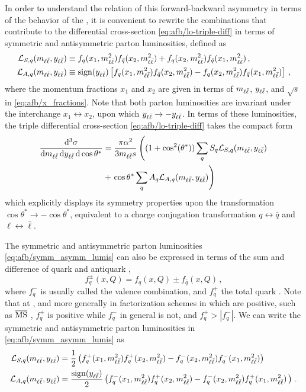 In order to understand the relation of this forward-backward
asymmetry in terms of the
behavior of the \pdfs, it is convenient
to rewrite the \pdf combinations that contribute to the differential
cross-section \cref{eq:afb/lo-triple-diff} in terms of symmetric and
antisymmetric parton luminosities, defined as
\begin{align}
  \mathcal{L}_{S,q}(m_{\ell\bar{\ell}}, y_{\ell\bar{\ell}}) &\equiv f_q(x_1,m_{\ell\bar{\ell}}^2) f_{\bar{q}}(x_2,m_{\ell\bar{\ell}}^2) + f_q(x_2,m_{\ell\bar{\ell}}^2) f_{\bar{q}}(x_1,m_{\ell\bar{\ell}}^2) \, ,
  \nonumber\\
  \mathcal{L}_{A,q}(m_{\ell\bar{\ell}}, y_{\ell\bar{\ell}}) &\equiv \operatorname{sign} (y_{\ell\bar{\ell}}) \left[ f_q(x_1,m_{\ell\bar{\ell}}^2) f_{\bar{q}}(x_2,m_{\ell\bar{\ell}}^2) - f_q(x_2,m_{\ell\bar{\ell}}^2) f_{\bar{q}}(x_1,m_{\ell\bar{\ell}}^2)\right] \, , \label{eq:afb/symm_asymm_lumis}
\end{align}
where the momentum fractions $x_1$ and $x_2$ are given in terms of $m_{\ell\bar{\ell}}$, $y_{\ell\bar{\ell}}$,
and $\sqrt{s}$ in \cref{eq:afb/x_fractions}.
Note that both parton luminosities are invariant under
the interchange $x_1\leftrightarrow x_2$, upon which $y_{\ell\bar{\ell}} \to -y_{\ell\bar{\ell}}$.
%
In terms of these luminosities, the triple differential cross-section
\cref{eq:afb/lo-triple-diff} takes the compact form
\begin{align}
  \frac{\dd^3 \sigma}{\dd m_{\ell\bar{\ell}} \, \dd y_{\ell\bar{\ell}} \, \dd\cos\theta^*} &=
  \frac{\pi \alpha^2}{3 m_{\ell\bar{\ell}} s} \left(
  (1+\cos^2({\theta^*})) \sum_q S_q \mathcal{L}_{S,q}(m_{\ell\bar{\ell}}, y_{\ell\bar{\ell}}) \right. \nonumber\\
  &+ \left. \cos\theta^* \sum_q A_q \mathcal{L}_{A,q}(m_{\ell\bar{\ell}}, y_{\ell\bar{\ell}})  \right)
  \label{eq:afb/lo-triple-diff-lumis}
\end{align}
which explicitly displays
its symmetry properties upon the transformation $\cos\theta^* \to -\cos\theta^*$,
equivalent to a charge conjugation transformation 
$q\leftrightarrow \bar q$ and $\ell \leftrightarrow \bar{\ell} $.

The symmetric and antisymmetric parton luminosities \cref{eq:afb/symm_asymm_lumis} can also be expressed
in terms of the sum and difference of quark and antiquark \pdfs,
\begin{equation}
  \label{eq:afb/fqpm}
  f_{q}^\pm \left( x, Q\right) = f_{q} \left( x, Q\right) \pm f_{\bar{q}} \left( x, Q\right) \, ,
\end{equation}
where $f_{q}^-$ is usually called the valence \pdf combination, and $f_{q}^+$
the total quark \pdf\@. Note that at \lo, and more generally in factorization
schemes in which \pdfs are positive, such as ${\overline{\textrm{MS}}}$ \cite{Candido:2020yat},
$f^+_q$ is positive while $f_q^-$ in general is not, and $f_{q}^+>|f_{q}^-|$.
%
We can write the symmetric and antisymmetric parton luminosities in
\cref{eq:afb/symm_asymm_lumis} as
\begin{align}
  \mathcal{L}_{S,q}(m_{\ell\bar{\ell}}, y_{\ell\bar{\ell}}) &= \frac {1} 2 \left( f_q^+(x_1,m_{\ell\bar{\ell}}^2) f_{q}^+(x_2,m_{\ell\bar{\ell}}^2) - f_q^-(x_2,m_{\ell\bar{\ell}}^2) f_{q}^-(x_1,m_{\ell\bar{\ell}}^2)  \right) \, \label{eq:afb/lumiss_qpm}\\
  \mathcal{L}_{A,q}(m_{\ell\bar{\ell}}, y_{\ell\bar{\ell}}) &= \frac {\operatorname{sign} (y_{\ell\bar{\ell}})} 2 \left( f_q^-(x_1,m_{\ell\bar{\ell}}^2) f_{q}^+(x_2,m_{\ell\bar{\ell}}^2) - f_q^-(x_2,m_{\ell\bar{\ell}}^2) f_{q}^+(x_1,m_{\ell\bar{\ell}}^2)  \, \right) \,. \label{eq:afb/lumisa_qpm}
\end{align}

